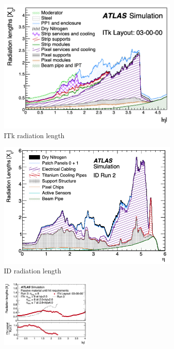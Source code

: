 \begin{figure}[h!]
\begin{subfigure}[b]{0.47\textwidth}
    \centering
    \includegraphics[width=\textwidth]{figures/itk-rad-length.png}
    \caption{ITk radiation length~\cite{Aad_2025}}
    \label{subfig:itk-rad-len}
\end{subfigure}
\begin{subfigure}[b]{0.51\textwidth}
    \centering
    \includegraphics[width=\textwidth]{figures/id-rad-length.png}
    \caption{ID radiation length \cite{ATLAS-TDR-25}}
    \label{subfig:id-rad-len}
\end{subfigure}
\begin{subfigure}[b]{\textwidth}
    \centering
    \includegraphics[width=0.5\textwidth]{figures/rad-length-to-reconstruct.png}

\end{subfigure}
\end{figure}
